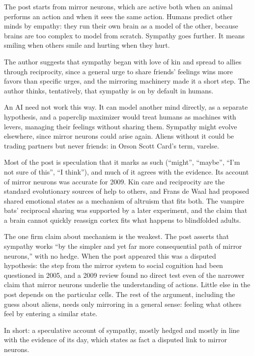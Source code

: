 \begin{afterword}
\summaryhead

The post starts from mirror neurons, which are active both when an animal performs an action and when it sees the same action. Humans predict other minds by empathy: they run their own brain as a model of the other, because brains are too complex to model from scratch. Sympathy goes further. It means smiling when others smile and hurting when they hurt.

The author suggests that sympathy began with love of kin and spread to allies through reciprocity, since a general urge to share friends' feelings wins more favors than specific urges, and the mirroring machinery made it a short step. The author thinks, tentatively, that sympathy is on by default in humans.

An AI need not work this way. It can model another mind directly, as a separate hypothesis, and a paperclip maximizer would treat humans as machines with levers, managing their feelings without sharing them. Sympathy might evolve elsewhere, since mirror neurons could arise again. Aliens without it could be trading partners but never friends: in Orson Scott Card's term, varelse.

\responsehead

Most of the post is speculation that it marks as such (``might'', ``maybe'', ``I'm not sure of this'', ``I think''), and much of it agrees with the evidence. Its account of mirror neurons was accurate for 2009. Kin care and reciprocity are the standard evolutionary sources of help to others, and Frans de Waal had proposed shared emotional states as a mechanism of altruism that fits both. The vampire bats' reciprocal sharing was supported by a later experiment, and the claim that a brain cannot quickly reassign cortex fits what happens to blindfolded adults.

The one firm claim about mechanism is the weakest. The post asserts that sympathy works ``by the simpler and yet far more consequential path of mirror neurons,'' with no hedge. When the post appeared this was a disputed hypothesis: the step from the mirror system to social cognition had been questioned in 2005, and a 2009 review found no direct test even of the narrower claim that mirror neurons underlie the understanding of actions. Little else in the post depends on the particular cells. The rest of the argument, including the guess about aliens, needs only mirroring in a general sense: feeling what others feel by entering a similar state.

In short: a speculative account of sympathy, mostly hedged and mostly in line with the evidence of its day, which states as fact a disputed link to mirror neurons.
\end{afterword}
